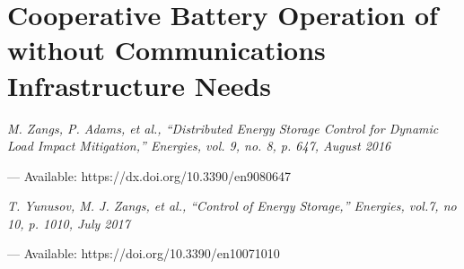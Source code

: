 \chapter{Cooperative Battery Operation of without Communications Infrastructure Needs}
\label{ch4}

\singlespacing
\epigraph{\textit{M. Zangs, P. Adams, et al., ``Distributed Energy Storage Control for Dynamic Load Impact Mitigation,'' Energies, vol. 9, no. 8, p. 647, August 2016}}{--- Available: https://dx.doi.org/10.3390/en9080647}
\epigraph{\textit{T. Yunusov, M. J. Zangs, et al., ``Control of Energy Storage,'' Energies, vol.7, no 10, p. 1010, July 2017}}{--- Available: https://doi.org/10.3390/en10071010}
\doublespacing



